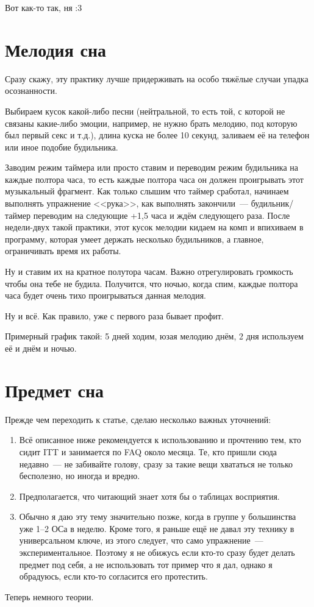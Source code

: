 \documentclass[a4paper,14pt,oneside]{memoir}
\begin{document}
Вот как-то так, ня :3



\chapter{Мелодия сна} 
Сразу скажу, эту практику лучше придерживать на особо тяжёлые случаи упадка осознанности. 

Выбираем кусок какой-либо песни (нейтральной, то есть той, с которой не связаны какие-либо эмоции, например, не нужно брать мелодию, под которую был первый секс и т.д.), длина куска не более 10 секунд, заливаем её на телефон или иное подобие будильника.
 
Заводим режим таймера или просто ставим и переводим режим будильника на каждые полтора часа, то есть каждые полтора часа он должен проигрывать этот музыкальный фрагмент. Как только слышим что таймер сработал, начинаем выполнять упражнение <<рука>>, как выполнять закончили~--- будильник/таймер переводим на следующие +1,5 часа и ждём следующего раза. После недели-двух такой практики, этот кусок мелодии кидаем на комп и впихиваем в программу, которая умеет держать несколько будильников, а главное, ограничивать время их работы. 

Ну и ставим их на кратное полутора часам. Важно отрегулировать громкость чтобы она тебе не будила. Получится, что ночью, когда спим, каждые полтора часа будет очень тихо проигрываться данная мелодия. 

Ну и всё. Как правило, уже с первого раза бывает профит.
 
Примерный график такой: 5 дней ходим, юзая мелодию днём, 2 дня используем её и днём и ночью. 



\chapter{Предмет сна}
Прежде чем переходить к статье, сделаю несколько важных уточнений:
\begin{enumerate}
\item Всё описанное ниже рекомендуется к использованию и прочтению тем, кто сидит ITT и занимается по FAQ около месяца. Те, кто пришли сюда недавно~--- не забивайте голову, сразу за такие вещи хвататься не только бесполезно, но иногда и вредно. 
\item Предполагается, что читающий знает хотя бы о таблицах восприятия.
\item Обычно я даю эту тему значительно позже, когда в группе у большинства уже 1--2 ОСа в неделю. Кроме того, я раньше ещё не давал эту технику в универсальном ключе, из этого следует, что само упражнение~--- экспериментальное. Поэтому я не обижусь если кто-то сразу будет делать предмет под себя, а не использовать тот пример что я дал, однако я обрадуюсь, если кто-то согласится его протестить.
\end{enumerate}
\smallskip
Теперь немного теории.
 
\end{document}

